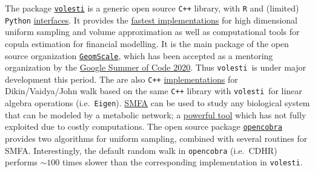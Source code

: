 \documentclass[a4paper, 12pt]{article}
\def\volesti{{\tt volesti}}
\begin{document}
The package \textcolor{blue}{\href{https://github.com/GeomScale/volume_approximation}{\volesti}} is a generic open source {\tt C++} library, with {\tt R} and (limited) {\tt Python} \textcolor{blue}{\href{https://CRAN.R-project.org/package=volesti}{interfaces}}. It provides the \textcolor{blue}{\href{https://github.com/GeomScale/volume_approximation/wiki}{fastest implementations}} for high dimensional uniform sampling and volume approximation as well as computational tools for copula estimation for financial modelling. It is the main package of the open source organization \textcolor{blue}{\href{https://geomscale.github.io/}{{\tt GeomScale}}}, which has been accepted as a mentoring organization by the \textcolor{blue}{\href{https://summerofcode.withgoogle.com/organizations/5673184117915648/}{Google Summer of Code 2020}}. Thus \volesti\ is under major development this period. The are also {\tt C++} \textcolor{blue}{\href{https://github.com/rzrsk/vaidya-walk}{implementations}} for Dikin/Vaidya/John walk based on the same {\tt C++} library with \volesti\ for linear algebra operations (i.e.\ {\tt Eigen}). \textcolor{blue}{\href{https://www.ncbi.nlm.nih.gov/pubmed/12000313}{SMFA}} can be used to study any biological system that can be modeled by a metabolic network; a \textcolor{blue}{\href{https://www.ncbi.nlm.nih.gov/pmc/articles/PMC6718391/}{powerful tool}} which has not fully exploited due to costly computations. The open source package \textcolor{blue}{\href{https://opencobra.github.io/}{{\tt opencobra}}} provides two algorithms for uniform sampling, combined with several routines for SMFA. Interestingly, the default random walk in {\tt opencobra} (i.e.\ CDHR) performs $\sim 100$ times slower than the corresponding implementation in \volesti. 






\end{document}
